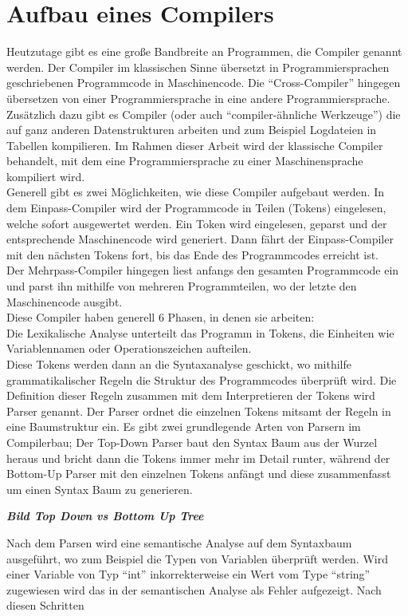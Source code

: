 \section{Aufbau eines Compilers}

Heutzutage gibt es eine große Bandbreite an Programmen, die Compiler genannt werden.
Der Compiler im klassischen Sinne übersetzt in Programmiersprachen geschriebenen Programmcode in Maschinencode.
Die ``Cross-Compiler'' hingegen übersetzen von einer Programmiersprache in eine andere Programmiersprache.
Zusätzlich dazu gibt es Compiler (oder auch ``compiler-ähnliche Werkzeuge'') die auf ganz anderen Datenstrukturen arbeiten und zum Beispiel Logdateien in Tabellen kompilieren.
Im Rahmen dieser Arbeit wird der klassische Compiler behandelt, mit dem eine Programmiersprache zu einer Maschinensprache kompiliert wird.\\
Generell gibt es zwei Möglichkeiten, wie diese Compiler aufgebaut werden.
In dem Einpass-Compiler wird der Programmcode in Teilen (Tokens) eingelesen, welche sofort ausgewertet werden.
Ein Token wird eingelesen, geparst und der entsprechende Maschinencode wird generiert.
Dann fährt der Einpass-Compiler mit den nächsten Tokens fort, bis das Ende des Programmcodes erreicht ist.\\
Der Mehrpass-Compiler hingegen liest anfangs den gesamten Programmcode ein und parst ihn mithilfe von mehreren Programmteilen, wo der letzte den Maschinencode ausgibt\cite{mossenbock:2024}.\\
Diese Compiler haben generell 6 Phasen, in denen sie arbeiten:\\
Die Lexikalische Analyse unterteilt das Programm in Tokens, die Einheiten wie Variablennamen oder Operationszeichen aufteilen.\\
Diese Tokens werden dann an die Syntaxanalyse geschickt, wo mithilfe grammatikalischer Regeln die Struktur des Programmcodes überprüft wird.
Die Definition dieser Regeln zusammen mit dem Interpretieren der Tokens wird Parser genannt.
Der Parser ordnet die einzelnen Tokens mitsamt der Regeln in eine Baumstruktur ein.
Es gibt zwei grundlegende Arten von Parsern im Compilerbau;
Der Top-Down Parser baut den Syntax Baum aus der Wurzel heraus und bricht dann die Tokens immer mehr im Detail runter, während der Bottom-Up Parser mit den einzelnen Tokens anfängt und diese zusammenfasst um einen Syntax Baum zu generieren\cite{meduna2007elements}.

\textbf{\textit{Bild Top Down vs Bottom Up Tree}}

Nach dem Parsen wird eine semantische Analyse auf dem Syntaxbaum ausgeführt, wo zum Beispiel die Typen von Variablen überprüft werden.
Wird einer Variable von Typ ``int'' inkorrekterweise ein Wert vom Type ``string'' zugewiesen wird das in der semantischen Analyse als Fehler aufgezeigt.
Nach diesen Schritten 
